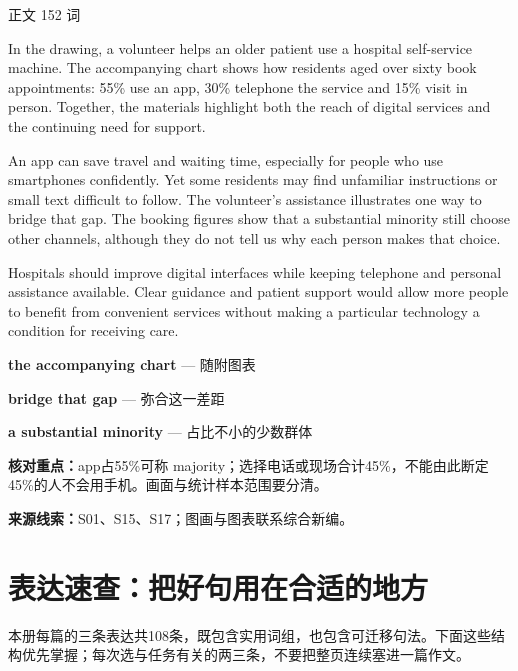 \documentclass[11pt,a4paper,fontset=macnew]{ctexart}
\newenvironment{example}{\begingroup\fontsize{11}{14.3}\selectfont\setlength{\parskip}{4pt}}{\par\endgroup}
\begin{document}
\par\vspace{4pt}{\bfseries 完整套用示例}\par\nopagebreak
{\small 正文 152 词}\par
\begin{example}
In the drawing, a volunteer helps an older patient use a hospital self-service machine. The accompanying chart shows how residents aged over sixty book appointments: 55\% use an app, 30\% telephone the service and 15\% visit in person. Together, the materials highlight both the reach of digital services and the continuing need for support.

An app can save travel and waiting time, especially for people who use smartphones confidently. Yet some residents may find unfamiliar instructions or small text difficult to follow. The volunteer's assistance illustrates one way to bridge that gap. The booking figures show that a substantial minority still choose other channels, although they do not tell us why each person makes that choice.

Hospitals should improve digital interfaces while keeping telephone and personal assistance available. Clear guidance and patient support would allow more people to benefit from convenient services without making a particular technology a condition for receiving care.

\end{example}
\par\vspace{4pt}{\bfseries 好词好句：优先记这三处}\par\nopagebreak
{\small\textbf{the accompanying chart} — 随附图表}\par
{\small\textbf{bridge that gap} — 弥合这一差距}\par
{\small\textbf{a substantial minority} — 占比不小的少数群体}\par
{\small\textbf{核对重点：}app占55\%可称 majority；选择电话或现场合计45\%，不能由此断定45\%的人不会用手机。画面与统计样本范围要分清。}\par
{\fontsize{8}{10}\selectfont\textbf{来源线索：}S01、S15、S17；图画与图表联系综合新编。}\par
\clearpage\section*{表达速查：把好句用在合适的地方}
本册每篇的三条表达共108条，既包含实用词组，也包含可迁移句法。下面这些结构优先掌握；每次选与任务有关的两三条，不要把整页连续塞进一篇作文。
\end{document}
